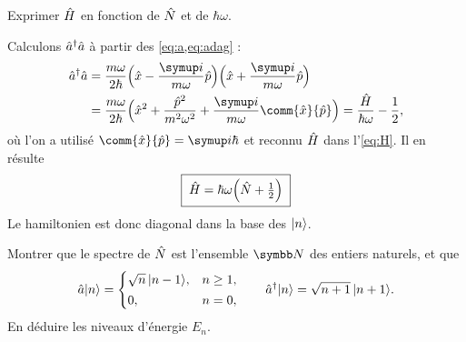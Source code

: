\begin{question}[2 pts]\label{q:H}
  Exprimer $\hat{H}$ en fonction de $\hat{N}$ et de $\hbar\omega$.
\end{question}

\begin{solution}
  Calculons $\hat{a}^{\dagger}\hat{a}$ à partir des \cref{eq:a,eq:adag} :
  \begin{align}
    \op{a}\adj\op{a}
      &= \frac{m\omega}{2\hbar}\Bigl(\op{x}-\frac{\ii}{m\omega}\op{p}\Bigr)
         \Bigl(\op{x}+\frac{\ii}{m\omega}\op{p}\Bigr) \notag\\
      &= \frac{m\omega}{2\hbar}\Bigl(\op{x}^{2}+\frac{\op{p}^{2}}{m^{2}\omega^{2}}
         +\frac{\ii}{m\omega}\comm{\op{x}}{\op{p}}\Bigr)
       = \frac{\op{H}}{\hbar\omega}-\frac12,
    \label{eq:NH}
  \end{align}
  où l'on a utilisé $\comm{\op{x}}{\op{p}}=\ii\hbar$ et reconnu $\hat{H}$
  dans l'\cref{eq:H}. Il en résulte
  \begin{equation}
    \boxed{\;\hat{H}=\hbar\omega\Bigl(\hat{N}+\tfrac12\Bigr)\;}
    \label{eq:Hdiag}
  \end{equation}
  Le hamiltonien est donc diagonal dans la base des $\lvert n\rangle$.
\end{solution}

\begin{question}[4 pts]\label{q:spectre}
  Montrer que le spectre de $\hat{N}$ est l'ensemble $\NN$ des entiers naturels,
  et que
  \begin{equation}
    \hat{a}\lvert n\rangle=
    \begin{cases}
      \sqrt{n}\,\lvert n-1\rangle, & n\geq 1,\\[2pt]
      0, & n=0,
    \end{cases}
    \qquad
    \hat{a}^{\dagger}\lvert n\rangle=\sqrt{n+1}\,\lvert n+1\rangle.
    \label{eq:action}
  \end{equation}
  En déduire les niveaux d'énergie $E_{n}$.
\end{question}

